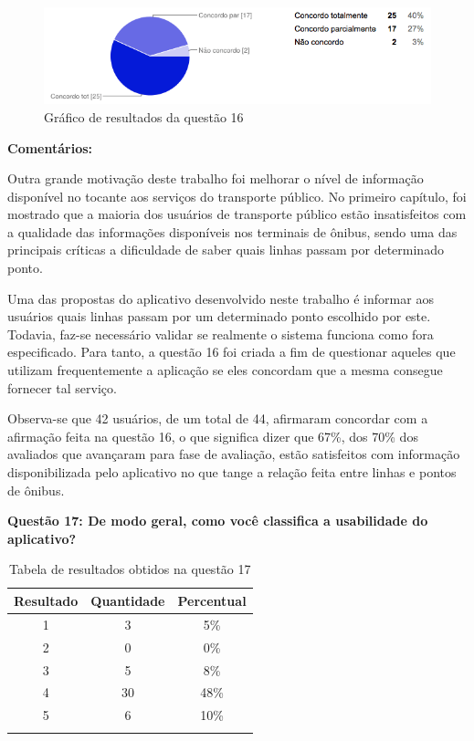 \begin{figure}[h]
\begin{center}
  \includegraphics[width=16cm]{images/graficos/questao16.png}
  \caption{Gráfico de resultados da questão 16}
  \label{fig:questao16}
\end{center}
\end{figure}

\textbf{Comentários:}

Outra grande motivação deste trabalho foi melhorar o nível de informação disponível no tocante aos serviços do transporte público. No primeiro capítulo, foi mostrado que a maioria dos usuários de transporte público estão insatisfeitos com a qualidade das informações disponíveis nos terminais de ônibus, sendo uma das principais críticas a dificuldade de saber quais linhas passam por determinado ponto. 

Uma das propostas do aplicativo desenvolvido neste trabalho é informar aos usuários quais linhas passam por um determinado ponto escolhido por este. Todavia, faz-se necessário validar se realmente o sistema funciona como fora especificado. Para tanto, a questão 16 foi criada a fim de questionar aqueles que utilizam frequentemente a aplicação se eles concordam que a mesma consegue fornecer tal serviço.

Observa-se que 42 usuários, de um total de 44, afirmaram concordar com a afirmação feita na questão 16, o que significa dizer que 67\%, dos 70\% dos avaliados que avançaram para fase de avaliação, estão satisfeitos com informação disponibilizada pelo aplicativo no que tange a relação feita entre linhas e pontos de ônibus. \newline

\textbf{Questão 17: De modo geral, como você classifica a usabilidade do aplicativo?}

\begin{center}
\begin{longtable}{c|c|c}
\hline
    \multicolumn{1}{c}{\textbf{Resultado}} & \multicolumn{1}{c}{\textbf{Quantidade}} & \multicolumn{1}{c}{\textbf{Percentual}} \\
\hline
    1 & 3 &  5\%\\
    \hline
    2 & 0 & 0\%\\
    \hline
    3 & 5 &  8\%\\
    \hline
    4 & 30 & 48\%\\
    \hline
    5 & 6 & 10\%\\
    \hline
\caption{Tabela de resultados obtidos na questão 17}
\label{tabq17}
\end{longtable}
\end{center}


